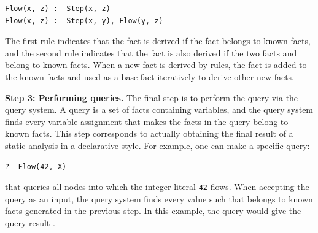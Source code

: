 \begin{lstlisting}[style=mrule]
Flow(x, z) :- Step(x, z)
Flow(x, z) :- Step(x, y), Flow(y, z)
\end{lstlisting}

\noindent
The first rule indicates that the fact  is derived if the
fact  belongs to known facts, and the second rule indicates
that the fact  is also derived if the two facts  and  belong to known facts.
When a new fact is derived by rules, the fact is added to the known facts and
used as a base fact iteratively to derive other new facts.


\smallskip
\textbf{Step 3: Performing queries.}
The final step is to perform the query via the query system.  
A query is a set of facts containing variables, and the query system finds
every variable assignment that makes the facts in the query belong to known
facts.
This step corresponds to actually obtaining the final result of a static
analysis in a declarative style.  
For example, one can make a specific query:

\begin{lstlisting}[style=mrule]
?- Flow(42, X)
\end{lstlisting}

\noindent
that queries all nodes into which the integer literal {\tt 42} flows.
When accepting the query as an input, the query system finds every value
 such that  belongs to known facts generated in
the previous step. 
In this example, the query would give the query result
.

